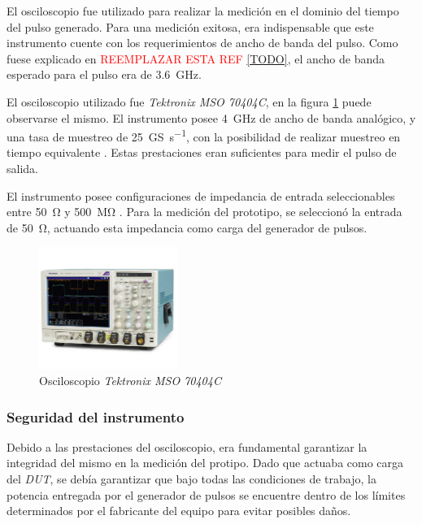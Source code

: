 El osciloscopio fue utilizado para realizar la medición en el dominio del tiempo
del pulso generado. Para una medición exitosa, era indispensable que este
instrumento cuente con los requerimientos de ancho de banda del pulso. Como fuese
explicado en \textcolor{red}{REEMPLAZAR ESTA REF \ref{TODO}}, el ancho de banda
esperado para el pulso era de \qty{3.6}{\giga\hertz}.

El osciloscopio utilizado fue \textit{Tektronix MSO 70404C}, en la figura 
\ref{fig:osciloscopio} puede observarse el mismo. El instrumento posee 
\qty{4}{\giga\hertz} de ancho de banda analógico, y una tasa de muestreo
de \qty[per-mode=symbol]{25}{\giga\siemens\per\second}, con la posibilidad de
realizar muestreo en tiempo equivalente \cite{oscilloscope_datasheet}. Estas
prestaciones eran suficientes para medir el pulso de salida.

El instrumento posee configuraciones de impedancia de entrada seleccionables entre
\qty{50}{\ohm} y \qty{500}{\mega\ohm} \cite{oscilloscope_datasheet}. Para la
medición del prototipo, se seleccionó la entrada de \qty{50}{\ohm}, actuando
esta impedancia como carga del generador de pulsos.

\begin{figure}
  \centering
    \includegraphics[width=0.4\textwidth]{images/osciloscopio.png}
    \caption{Osciloscopio \textit{Tektronix MSO 70404C}}
    \label{fig:osciloscopio}
\end{figure}

\subsubsection{Seguridad del instrumento}

Debido a las prestaciones del osciloscopio, era fundamental garantizar la
integridad del mismo en la medición del protipo. Dado que actuaba como carga del
\textit{DUT}, se debía garantizar que bajo todas las condiciones de
trabajo, la potencia entregada por el generador de pulsos se encuentre dentro de
los límites determinados por el fabricante del equipo para evitar posibles daños.

